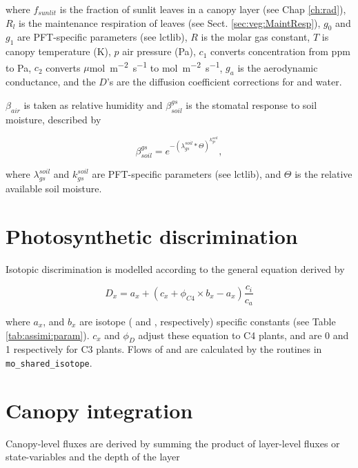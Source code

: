 where $f_{sunlit}$ is the fraction of sunlit leaves in a canopy layer (see Chap \ref{ch:rad}), $R_l$ is the maintenance respiration of leaves (see Sect. \ref{sec:veg:MaintResp}), $g_0$ and $g_1$ are PFT-specific parameters (see lctlib), $R$ is the molar gas constant, $T$ is canopy temperature (K), $p$ air pressure (Pa), $c_1$ converts  concentration from ppm to Pa, $c_2$ converts $\mu$\unit{mol m^{-2} s^{-1}} to \unit{mol m^{-2} s^{-1}}, $g_a$ is the aerodynamic conductance, and the $D$'s are the diffusion coefficient corrections for  and water.

$\beta_{air}$ is taken as relative humidity \cite{Ball:1987uv, Knauer:2015dh} and $\beta_{soil}^{gs}$ is the stomatal response to soil moisture, described by 

\begin{equation}
\beta_{soil}^{gs} = e^{-(\lambda^{soil}_{gs}*\Theta)^{k^{soil}_{gs}}},
\end{equation}

where $\lambda^{soil}_{gs}$ and $k^{soil}_{gs}$ are PFT-specific parameters (see lctlib), and $\Theta$ is the relative available soil moisture.

\section{Photosynthetic discrimination}

Isotopic discrimination is modelled according to the general equation derived by \cite{ Drake:2014dl}

\begin{equation}\label{eq:ps_discrimination}
D_x = a_x + ( c_x + \phi_{C4} \times b_x - a_x )  \frac{c_i}{c_a}
\end{equation}

where $a_x$, and $b_x$ are isotope ( and , respectively) specific constants (see Table \ref{tab:assimi:param}). $c_x$ and $\phi_D$ adjust these equation to C4 plants, and are 0 and 1 respectively for C3 plants. Flows of  and  are calculated by the routines in \texttt{mo\_shared\_isotope}.

\section{Canopy integration}

Canopy-level fluxes are derived by summing the product of layer-level fluxes or state-variables and the depth of the layer

